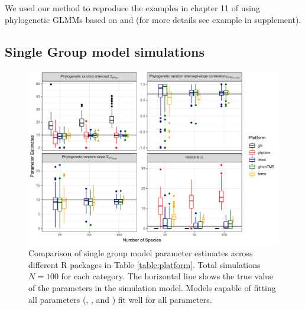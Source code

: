 \documentclass[12pt]{article}
\begin{document}
We used our method to reproduce the examples in chapter 11 of \cite{garamszegi2014modern} using phylogenetic GLMMs based on  and  (for more details see example in supplement).

\subsection*{Single Group model simulations}

\begin{center}
\begin{figure}[H]
  \includegraphics[scale=0.7,page=1]{./figure/ssplot.pdf}
  \caption{Comparison of single group model parameter estimates across different R packages in Table \ref{table:platform}. Total simulations $N=100$ for each category. The horizontal line shows the true value of the parameters in the simulation model. Models capable of fitting all parameters (,  , and ) fit well for all parameters. 
}
\label{ssplot}
\end{figure}
\end{center}
\end{document}
